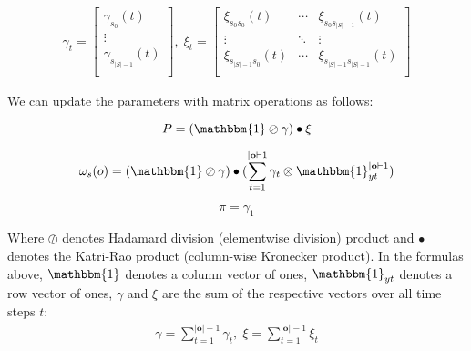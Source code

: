 \begin{align}
{\gamma}
    _t = \begin{bmatrix}
             \gamma_{s_0}(t)       \\
             \vdots                \\
             \gamma_{s_{|S|-1}}(t) \\
    \end{bmatrix}, \;
    {\xi}_t = \begin{bmatrix}
                  \xi_{s_0 s_0}(t)      & \cdots & \xi_{s_0 s_{|S|-1}}(t)      \\
                  \vdots                & \ddots & \vdots                      \\
                  \xi_{s_{|S|-1}s_0}(t) & \cdots & \xi_{s_{|S|-1}s_{|S|-1}}(t) \\
    \end{bmatrix}
\end{align}

We can update the parameters with matrix operations as follows:

\begin{equation}
{P}
    = (\mathbbm{1} \oslash \gamma) \bullet \xi
    \label{eq:transition-probabilities-update}
\end{equation}

\begin{equation}
{\omega}
    _s(o) = (\mathbbm{1} \oslash \gamma) \bullet (\sum_{t=1}^{|\mathbf{o}|-1} \gamma_t \otimes \mathbbm{1}_{yt}^{|\mathbf{o}|-1})
    \label{eq:omega-update}
\end{equation}

\begin{equation}
{\pi}
    = {\gamma}_1
    \label{eq:initial-probabilities-update}
\end{equation}

Where $\oslash$ denotes Hadamard division (elementwise division) product and $\bullet$ denotes the Katri-Rao product (column-wise Kronecker product).
In the formulas above, $\mathbbm{1}$ denotes a column vector of ones, $\mathbbm{1}_{yt}$ denotes a row vector of ones, $\gamma$ and $\xi$ are the sum of the respective vectors over all time steps $t$:
\begin{align}
    \gamma = \sum_{t=1}^{|\mathbf{o}|-1} \gamma_t, \;
    \xi = \sum_{t=1}^{|\mathbf{o}|-1} \xi_t
\end{align} 


